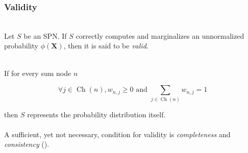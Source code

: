 \documentclass{beamer}
\DeclareMathOperator*{\Ch}{\text{Ch}}
\newcommand{\mbf}[1]{\mathbf{#1}}
\begin{document}
\begin{frame}
  \frametitle{Validity}

  \begin{definition}[Validity]~\\
    Let $S$ be an SPN. If $S$ correctly computes and marginalizes an unnormalized probability
    $\phi(\mbf{X})$, then it is said to be \emph{valid}.
  \end{definition}~\\

  If for every sum node $n$

  \begin{equation*}
    \forall j\in\Ch(n), w_{n,j} \geq 0\text{ and }\sum_{j\in\Ch(n)}w_{n,j} = 1
  \end{equation*}

  then $S$ represents the probability distribution itself.\\~\\

  A sufficient, yet not necessary, condition for validity is \emph{completeness} and
  \emph{consistency} (\cite{poon-domingos}).

\end{frame}
\end{document}
